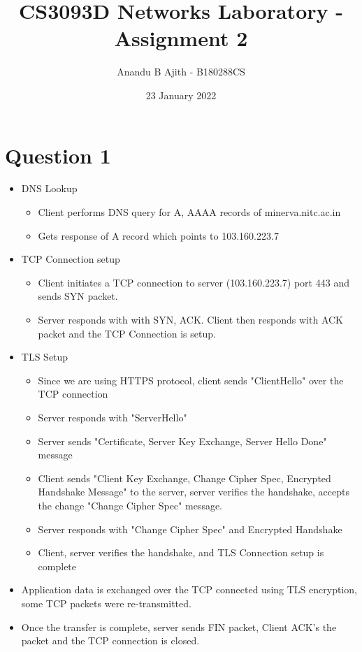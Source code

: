 \documentclass{article}
\title{CS3093D Networks Laboratory  - Assignment 2}
\author{Anandu B Ajith - B180288CS}
\date{23 January 2022}
\begin{document}
\maketitle

\section*{Question 1}
\vspace{10pt}

\begin{itemize}
    \item DNS Lookup\begin{itemize}
        \item Client performs DNS query for A, AAAA records of minerva.nitc.ac.in
        \item Gets response of A record which points to 103.160.223.7
    \end{itemize}
    \item TCP Connection setup \begin{itemize}
        \item Client initiates a TCP connection to server (103.160.223.7) port 443 and sends SYN packet.
        \item Server responds with with SYN, ACK. Client then responds with ACK packet and the TCP Connection is setup.
    \end{itemize}
    \item TLS Setup \begin{itemize}
        \item Since we are using HTTPS protocol, client sends "ClientHello" over the TCP connection
        \item Server responds with "ServerHello"
        \item Server sends "Certificate, Server Key Exchange, Server Hello Done" message
        \item Client sends "Client Key Exchange, Change Cipher Spec, Encrypted Handshake Message" to the server, server verifies the handshake, accepts the change "Change Cipher Spec" message.
        \item Server responds with "Change Cipher Spec" and Encrypted Handshake
        \item Client, server verifies the handshake, and TLS Connection setup is complete
    \end{itemize}
    \item Application data is exchanged over the TCP connected using TLS encryption, some TCP packets were re-transmitted.
    \item Once the transfer is complete, server sends FIN packet, Client ACK's the packet and the TCP connection is closed.
\end{itemize}
\end{document}
